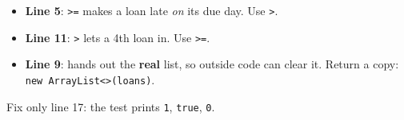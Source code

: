 \documentclass[aspectratio=169]{beamer}
\newcommand{\code}[1]{\texttt{#1}}
\begin{document}
\begin{frame}
\begin{columns}[T,onlytextwidth]
\begin{onlyenv}
\begin{itemize}[itemsep=0.25em, leftmargin=1em]
            \code{Member} reaches into \code{Loan}. Ask the expert:
            \code{if (l.isLate(day)) n++;}
      \item \textbf{Line 5}: \code{>=} makes a loan late \emph{on} its due day. Use
            \code{>}.
      \item \textbf{Line 11}: \code{>} lets a 4th loan in. Use \code{>=}.
      \item \textbf{Line 9}: hands out the \textbf{real} list, so outside code can
            clear it. Return a copy: \code{new ArrayList<>(loans)}.
    \end{itemize}
    {\footnotesize Fix only line 17: the test prints \code{1}, \code{true}, \code{0}.}
    \end{onlyenv}
  \end{columns}
\end{frame}
\end{document}
